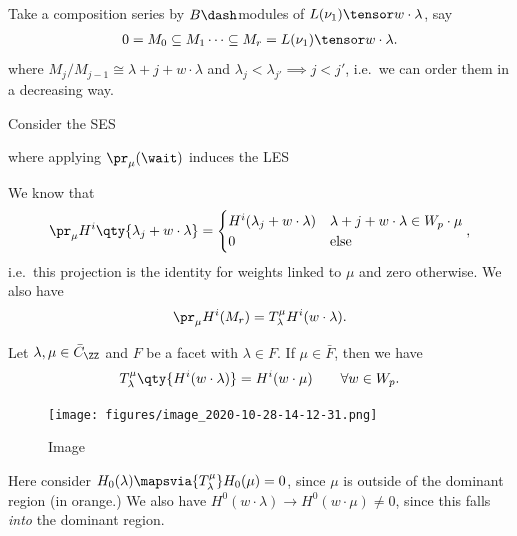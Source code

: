 Take a composition series by \(B\dash\)modules of
\(L(\nu_1) \tensor w\cdot \lambda\), say
\begin{align*}  
0 = M_0 \subseteq M_1 \cdots \subseteq M_r = L(\nu_1) \tensor w\cdot \lambda
.\end{align*} where \(M_j / M_{j-1} \cong \lambda+j + w\cdot \lambda\)
and \(\lambda_j < \lambda_{j'} \implies j < j'\), i.e.~we can order them
in a decreasing way.

Consider the SES

\begin{center}
\end{center}

where applying \(\pr_\mu(\wait)\) induces the LES

\begin{center}
\end{center}

We know that
\begin{align*}  
\pr_\mu H^i\qty{\lambda_j + w\cdot \lambda} = 
\begin{cases}
H^i(\lambda_j + w\cdot \lambda ) & \lambda+j + w\cdot \lambda \in W_p\cdot \mu \\
0 & \text{else}
\end{cases}
,\end{align*} i.e.~this projection is the identity for weights linked to
\(\mu\) and zero otherwise. We also have
\begin{align*}  
\pr_\mu H^i(M_r) = T_\lambda^\mu H^i(w\cdot \lambda)
.\end{align*}

\begin{theorem}[?]

Let \(\lambda, \mu \in \bar{C}_\ZZ\) and \(F\) be a facet with
\(\lambda \in F\). If \(\mu \in \bar{F}\), then we have
\begin{align*}  
T_\lambda^\mu\qty{H^i(w\cdot \lambda)} = H^i(w\cdot \mu) \qquad \forall w\in W_p
.\end{align*}

\end{theorem}

\begin{example}[?]

\begin{figure}
\centering
\texttt{[image: figures/image\_2020-10-28-14-12-31.png]}
\caption{Image}
\end{figure}

Here consider \(H_0(\lambda) \mapsvia{T_\lambda^\mu} H_0(\mu) = 0\),
since \(\mu\) is outside of the dominant region (in orange.) We also
have \(H^0(w\cdot \lambda) \to H^0(w\cdot \mu) \neq 0\), since this
falls \emph{into} the dominant region.

\end{example}

